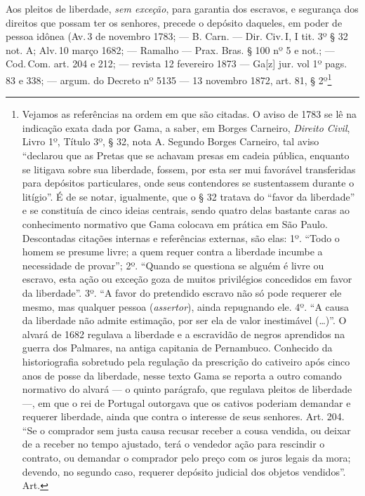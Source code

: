 Aos pleitos de liberdade, \emph{sem exceção}, para garantia dos
escravos, e segurança dos direitos que possam ter os senhores, precede o
depósito daqueles, em poder de pessoa idônea (Av.\,3 de novembro 1783; ---
B. Carn. --- Dir. Civ.\,I, I tit. 3º § 32 not. A; Alv.\,10 março 1682; ---
Ramalho --- Prax. Bras. § 100 nº 5 e not.; --- Cod.\,Com. art. 204 e 212; ---
revista 12 fevereiro 1873 --- Ga{[}z{]} jur. vol 1º pags. 83 e 338; ---
argum. do Decreto nº 5135 --- 13 novembro 1872, art. 81, § 2º\footnote{
  Vejamos as referências na ordem em que são citadas. O aviso de 1783 se
  lê na indicação exata dada por Gama, a saber, em Borges Carneiro,
  \emph{Direito Civil}, Livro 1º, Título 3º, § 32, nota A. Segundo
  Borges Carneiro, tal aviso ``declarou que as Pretas que se achavam
  presas em cadeia pública, enquanto se litigava sobre sua liberdade,
  fossem, por esta ser mui favorável transferidas para depósitos
  particulares, onde seus contendores se sustentassem durante o
  litígio''. É de se notar, igualmente, que o § 32 tratava do ``favor da
  liberdade'' e se constituía de cinco ideias centrais, sendo quatro
  delas bastante caras ao conhecimento normativo que Gama colocava em
  prática em São Paulo. Descontadas citações internas e referências
  externas, são elas: 1º. ``Todo o homem se presume livre; a quem requer
  contra a liberdade incumbe a necessidade de provar''; 2º.
  ``Quando se questiona se alguém é livre ou escravo, esta ação ou
  exceção goza de muitos privilégios concedidos em favor da liberdade''.
  3º. ``A favor do pretendido escravo não só pode requerer ele mesmo, mas
  qualquer pessoa (\emph{assertor}), ainda repugnando ele. 4º. ``A causa
  da liberdade não admite estimação, por ser ela de valor inestimável
  (\ldots{})''. O alvará de 1682 regulava a liberdade e a escravidão de negros
  aprendidos na guerra dos Palmares, na antiga capitania de Pernambuco.
  Conhecido da historiografia sobretudo pela regulação da prescrição do
  cativeiro após cinco anos de posse da liberdade, nesse texto Gama se
  reporta a outro comando normativo do alvará --- o quinto parágrafo, que
  regulava pleitos de liberdade ---, em que o rei de Portugal outorgava que
  os cativos poderiam demandar e requerer liberdade, ainda que contra o
  interesse de seus senhores. Art. 204. ``Se o comprador sem justa causa
  recusar receber a cousa vendida, ou deixar de a receber no tempo
  ajustado, terá o vendedor ação para rescindir o contrato, ou demandar
  o comprador pelo preço com os juros legais da mora; devendo, no
  segundo caso, requerer depósito judicial dos objetos vendidos''. Art.
}
